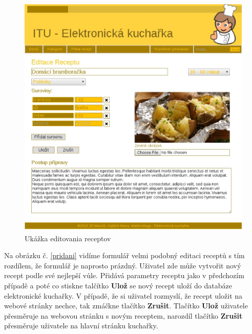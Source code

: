 \documentclass[12pt,a4paper,titlepage,final]{article}
\begin{document}
\begin{figure}

\begin{center}

\includegraphics[scale=0.7]{img/edit.eps} 
\caption{Ukážka editovania receptov}
\label{edit}

\end{center}

\end{figure}

Na obrázku č. \ref{pridani} vidíme formulář velmi podobný editaci receptů s tím rozdílem, že formulář je naprosto prázdný. Uživatel zde může vytvořit nový recept podle své nejlepší vůle. Přidává parametry receptu jako v předchozím případě a poté co stiskne talčítko \textbf{Ulož} se nový recept uloží do databáze elektronické kuchařky. V případě, že si uživatel rozmyslí, že recept uložit na webové stránky nechce, tak zmáčkne tlačítko \textbf{Zrušit}. Tlačítko \textbf{Ulož} uživatele přesměruje na webovou stránku s novým receptem, narozdíl tlačítko \textbf{Zrušit} přesměruje uživatele na hlavní stránku kuchařky.\newline
\end{document}
